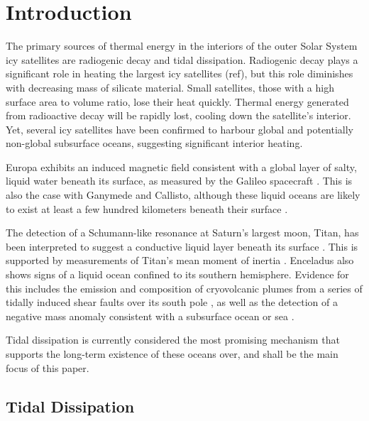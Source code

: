 \newpage
\section{Introduction}


The primary sources of thermal energy in the interiors of the outer Solar System icy satellites are radiogenic decay and tidal dissipation. Radiogenic decay plays a significant role in heating the largest icy satellites (ref), but this role diminishes with decreasing mass of silicate material. Small satellites, those with a high surface area to volume ratio, lose their heat quickly. Thermal energy generated from radioactive decay will be rapidly lost, cooling down the satellite's interior. Yet, several icy satellites have been confirmed to harbour global and potentially non-global subsurface oceans, suggesting significant interior heating.

Europa exhibits an induced magnetic field consistent with a global layer of salty, liquid water beneath its surface, as measured by the Galileo spacecraft \citep{zimmer2000subsurface, kivelson2000galileo, hand2007empirical}. This is also the case with Ganymede and Callisto, although these liquid oceans are likely to exist at least a few hundred kilometers beneath their surface \citep{zimmer2000subsurface, kivelson2000galileo}. 

The detection of a Schumann-like resonance at Saturn's largest moon, Titan, has been interpreted to suggest a conductive liquid layer beneath its surface \citep{beghin2010titan}. This is supported by measurements of Titan's mean moment of inertia \citep{bills2011rotational}. Enceladus also shows signs of a liquid ocean confined to its southern hemisphere. Evidence for this includes the emission and composition of cryovolcanic plumes from a series of tidally induced shear faults over its south pole \citep{hansen2011composition}, as well as the detection of a negative mass anomaly consistent with a subsurface ocean or sea \citep{iess2014gravity}. 

Tidal dissipation is currently considered the most promising mechanism that supports the long-term existence of these oceans over, and shall be the main focus of this paper.

\subsection{Tidal Dissipation}

